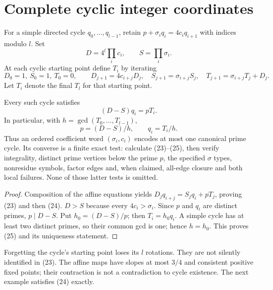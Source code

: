 \section{Complete cyclic integer coordinates}
For a simple directed cycle $q_0,\ldots,q_{l-1}$, retain
$p+\sigma_iq_i=4c_iq_{i+1}$ with indices modulo $l$. Set
\[
 D=4^l\prod_i c_i,\qquad S=\prod_i\sigma_i.
\]
At each cyclic starting point define $T_i$ by iterating
\[
 D_0=1,\ S_0=1,\ T_0=0,\qquad
 D_{j+1}=4c_{i+j}D_j,\quad S_{j+1}=\sigma_{i+j}S_j,
 \quad T_{j+1}=\sigma_{i+j}T_j+D_j.                       \tag{23}
\]
Let $T_i$ denote the final $T_l$ for that starting point.
\begin{theorem}
Every such cycle satisfies
\[
 \boxed{(D-S)q_i=pT_i.}                                   \tag{24}
\]
In particular, with $h=\gcd(T_0,\ldots,T_{l-1})$,
\[
 \boxed{p=(D-S)/h,\qquad q_i=T_i/h.}                       \tag{25}
\]
Thus an ordered coefficient word $(\sigma_i,c_i)$ encodes at most one canonical
prime cycle. Its converse is a finite exact test: calculate (23)--(25), then
verify integrality, distinct prime vertices below the prime $p$, the specified
$\sigma$ types, nonresidue symbols, factor edges and, when claimed, all-edge
closure and both local failures. None of those latter tests is omitted.
\end{theorem}
\begin{proof}
Composition of the affine equations yields
$D_jq_{i+j}=S_jq_i+pT_j$, proving (23) and then (24).
$D>S$ because every $4c_i>\sigma_i$. Since $p$ and $q_i$ are distinct primes,
$p\mid D-S$. Put $h_0=(D-S)/p$; then $T_i=h_0q_i$.
A simple cycle has at least two distinct primes, so their common gcd is one;
hence $h=h_0$. This proves (25) and its uniqueness statement.
\end{proof}
Forgetting the cycle's starting point loses its $l$ rotations. They are not
silently identified in (23). The affine maps have slopes at most $3/4$ and
consistent positive fixed points; their contraction is not a contradiction to
cycle existence. The next example satisfies (24) exactly.

